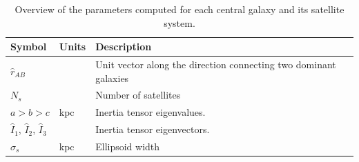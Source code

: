 \documentclass[a4paper,fleqn,usenatbib]{mnras}
\begin{document}
\begin{table}
  \centering
\begin{tabular}{lll}
\hline\hline
Symbol & Units & Description\\\hline
$\hat{r}_{AB}$& & Unit vector along the direction connecting two
dominant galaxies\\
$N_s$ & & Number of satellites\\
$a > b> c$ & kpc & Inertia tensor eigenvalues. \\
$\hat{I}_1$, $\hat{I}_2$, $\hat{I}_3$ & & Inertia tensor eigenvectors. \\
$\sigma_s$ & kpc & Ellipsoid width\\
\hline\hline
\end{tabular}
  \caption{Overview of the parameters computed for each central galaxy
    and its satellite system.
  \label{tab:models}}
\end{table}







\end{document}
